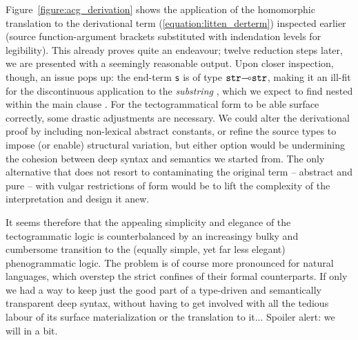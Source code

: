 Figure~\ref{figure:acg_derivation} shows the application of the homomorphic translation to the derivational term (\ref{equation:litten_derterm}) inspected earlier (source function-argument brackets substituted with indendation levels for legibility).
This already proves quite an endeavour; twelve reduction steps later, we are presented with a seemingly reasonable output.
Upon closer inspection, though, an issue pops up: the end-term $\mathsf{s}$ is of type $\mathtt{str}\li\mathtt{str}$, making it an ill-fit for the discontinuous application to the \textit{substring} , which we expect to find nested within the main clause .
For the tectogrammatical form to be able surface correctly, some drastic adjustments are necessary.
We could alter the derivational proof by including non-lexical abstract constants, or refine the source types to impose (or enable) structural variation, but either option would be undermining the cohesion between deep syntax and semantics we started from.
The only alternative that does not resort to contaminating the original term -- abstract and pure -- with vulgar restrictions of form would be to lift the complexity of the interpretation and design it anew.

It seems therefore that the appealing simplicity and elegance of the tectogrammatic logic is counterbalanced by an increasingy bulky and cumbersome transition to the (equally simple, yet far less elegant) phenogrammatic logic.
The problem is of course more pronounced for natural languages, which overstep the strict confines of their formal counterparts.
If only we had a way to keep just the good part of a type-driven and semantically transparent deep syntax, without having to get involved with all the tedious labour of its surface materialization or the translation to it...
Spoiler alert: we will in a bit.


